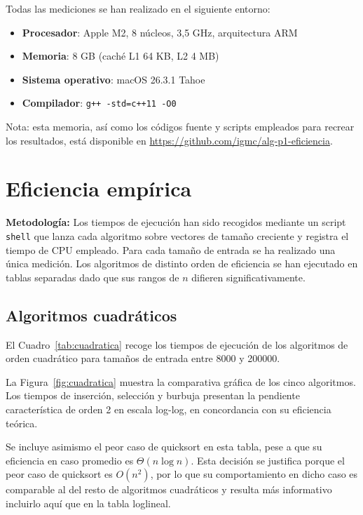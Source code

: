 \documentclass[12pt]{article}
\begin{document}
Todas las mediciones se han realizado en el siguiente entorno:
\begin{itemize}
    \item \textbf{Procesador}: Apple M2, 8 núcleos, 3,5 GHz, arquitectura ARM
    \item \textbf{Memoria}: 8 GB (caché L1 64 KB, L2 4 MB)
    \item \textbf{Sistema operativo}: macOS 26.3.1 Tahoe
    \item \textbf{Compilador}: \texttt{g++ -std=c++11 -O0}
\end{itemize}

Nota: esta memoria, así como los códigos fuente y scripts empleados para recrear
los resultados, está disponible en \url{https://github.com/igmc/alg-p1-eficiencia}.

\section{Eficiencia empírica}

\textbf{Metodología:} Los tiempos de ejecución han sido recogidos mediante un
script \texttt{shell} que lanza cada algoritmo sobre vectores de tamaño creciente
y registra el tiempo de CPU empleado. Para cada tamaño de entrada se ha realizado
una única medición. Los algoritmos de distinto orden de eficiencia se han ejecutado
en tablas separadas dado que sus rangos de $n$ difieren significativamente.

\subsection{Algoritmos cuadráticos}

El Cuadro~\ref{tab:cuadratica} recoge los tiempos de ejecución de los algoritmos
de orden cuadrático para tamaños de entrada entre 8000 y 200000.



La Figura~\ref{fig:cuadratica} muestra la comparativa gráfica de los cinco algoritmos.
Los tiempos de inserción, selección y burbuja presentan la pendiente característica
de orden 2 en escala log-log, en concordancia con su eficiencia teórica.

Se incluye asimismo el peor caso de quicksort en esta tabla, pese a que su 
eficiencia en caso promedio es $\Theta(n \log n)$. Esta decisión se justifica 
porque el peor caso de quicksort es $O(n^2)$, por lo que su comportamiento 
en dicho caso es comparable al del resto de algoritmos cuadráticos y resulta 
más informativo incluirlo aquí que en la tabla loglineal.
\end{document}
